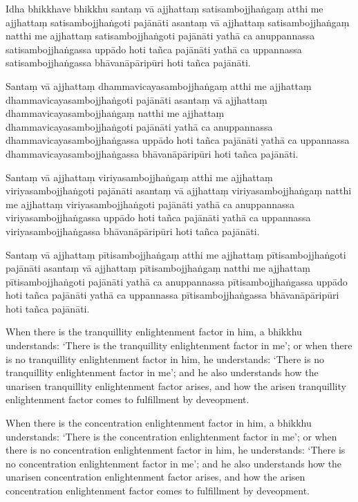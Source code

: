 \paliPage

Idha bhikkhave bhikkhu santaṃ vā ajjhattaṃ satisambojjhaṅgaṃ atthi me ajjhattaṃ
satisambojjhaṅgoti pajānāti asantaṃ vā ajjhattaṃ satisambojjhaṅgaṃ natthi me
ajjhattaṃ satisambojjhaṅgoti pajānāti yathā ca anuppannassa satisambojjhaṅgassa
uppādo hoti tañca pajānāti yathā ca uppannassa satisambojjhaṅgassa
bhāvanāpāripūri hoti tañca pajānāti.

Santaṃ vā ajjhattaṃ dhammavicayasambojjhaṅgaṃ atthi me ajjhattaṃ
dhammavicayasambojjhaṅgoti pajānāti asantaṃ vā ajjhattaṃ
dhammavicayasambojjhaṅgaṃ natthi me ajjhattaṃ dhammavicayasambojjhaṅgoti
pajānāti yathā ca anuppannassa dhammavicayasambojjhaṅgassa uppādo hoti tañca
pajānāti yathā ca uppannassa dhammavicayasambojjhaṅgassa bhāvanāpāripūri hoti
tañca pajānāti.

Santaṃ vā ajjhattaṃ viriyasambojjhaṅgaṃ atthi me ajjhattaṃ viriyasambojjhaṅgoti
pajānāti asantaṃ vā ajjhattaṃ viriyasambojjhaṅgaṃ natthi me ajjhattaṃ
viriyasambojjhaṅgoti pajānāti yathā ca anuppannassa viriyasambojjhaṅgassa uppādo
hoti tañca pajānāti yathā ca uppannassa viriyasambojjhaṅgassa bhāvanāpāripūri
hoti tañca pajānāti.

Santaṃ vā ajjhattaṃ pītisambojjhaṅgaṃ atthi me ajjhattaṃ pītisambojjhaṅgoti
pajānāti asantaṃ vā ajjhattaṃ pītisambojjhaṅgaṃ natthi me ajjhattaṃ
pītisambojjhaṅgoti pajānāti yathā ca anuppannassa pītisambojjhaṅgassa uppādo
hoti tañca pajānāti yathā ca uppannassa pītisambojjhaṅgassa bhāvanāpāripūri hoti
tañca pajānāti.

\englishPage

When there is the tranquillity enlightenment factor in him, a bhikkhu
understands: `There is the tranquillity enlightenment factor in me'; or when
there is no tranquillity enlightenment factor in him, he understands: `There is
no tranquillity enlightenment factor in me'; and he also understands how the
unarisen tranquillity enlightenment factor arises, and how the arisen
tranquillity enlightenment factor comes to fulfillment by deveopment.

When there is the concentration enlightenment factor in him, a bhikkhu
understands: `There is the concentration enlightenment factor in me'; or when
there is no concentration enlightenment factor in him, he understands: `There is
no concentration enlightenment factor in me'; and he also understands how the
unarisen concentration enlightenment factor arises, and how the arisen
concentration enlightenment factor comes to fulfillment by deveopment.

